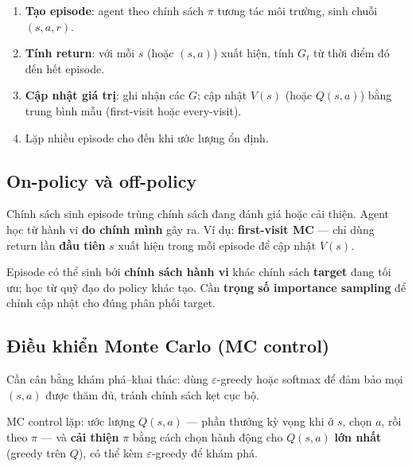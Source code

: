 \begin{phuongphap}[title={Quy trình ước lượng từng bước}]
\begin{enumerate}
  \item \textbf{Tạo episode}: agent theo chính sách $\pi$ tương tác môi trường, sinh chuỗi $(s,a,r)$.
  \item \textbf{Tính return}: với mỗi $s$ (hoặc $(s,a)$) xuất hiện, tính $G_t$ từ thời điểm đó đến hết episode.
  \item \textbf{Cập nhật giá trị}: ghi nhận các $G$; cập nhật $V(s)$ (hoặc $Q(s,a)$) bằng trung bình mẫu (first-visit hoặc every-visit).
  \item Lặp nhiều episode cho đến khi ước lượng ổn định.
\end{enumerate}
\end{phuongphap}

\subsection{On-policy và off-policy}

\begin{ynghia}[title={On-policy}]
Chính sách sinh episode trùng chính sách đang đánh giá hoặc cải thiện. Agent học từ hành vi \textbf{do chính mình} gây ra. Ví dụ: \textbf{first-visit MC} --- chỉ dùng return lần \textbf{đầu tiên} $s$ xuất hiện trong mỗi episode để cập nhật $V(s)$.
\end{ynghia}

\begin{ynghia}[title={Off-policy}]
Episode có thể sinh bởi \textbf{chính sách hành vi} khác chính sách \textbf{target} đang tối ưu; học từ quỹ đạo do policy khác tạo. Cần \textbf{trọng số importance sampling} để chỉnh cập nhật cho đúng phân phối target.
\end{ynghia}

\subsection{Điều khiển Monte Carlo (MC control)}

\begin{ynghia}[title={Khám phá trong MC}]
Cần cân bằng khám phá--khai thác: dùng $\varepsilon$-greedy hoặc softmax để đảm bảo mọi $(s,a)$ được thăm đủ, tránh chính sách kẹt cục bộ.
\end{ynghia}

\begin{ynghia}[title={Cải thiện chính sách qua $Q$}]
MC control lặp: ước lượng $Q(s,a)$ --- phần thưởng kỳ vọng khi ở $s$, chọn $a$, rồi theo $\pi$ --- và \textbf{cải thiện} $\pi$ bằng cách chọn hành động cho $Q(s,a)$ \textbf{lớn nhất} (greedy trên $Q$), có thể kèm $\varepsilon$-greedy để khám phá.
\end{ynghia}

